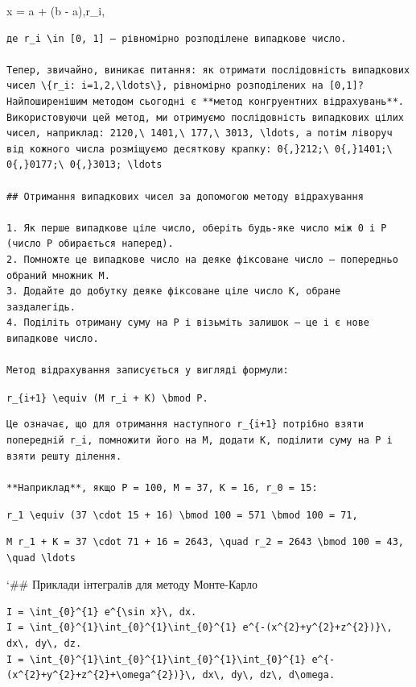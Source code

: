 \documentclass[
  ukrainian,
]{article}
\begin{document}
x = a + (b - a),r\_i,

\begin{verbatim}
де r_i \in [0, 1] — рівномірно розподілене випадкове число.

Тепер, звичайно, виникає питання: як отримати послідовність випадкових чисел \{r_i: i=1,2,\ldots\}, рівномірно розподілених на [0,1]? Найпоширенішим методом сьогодні є **метод конгруентних відрахувань**. Використовуючи цей метод, ми отримуємо послідовність випадкових цілих чисел, наприклад: 2120,\ 1401,\ 177,\ 3013, \ldots, а потім ліворуч від кожного числа розміщуємо десяткову крапку: 0{,}212;\ 0{,}1401;\ 0{,}0177;\ 0{,}3013; \ldots

## Отримання випадкових чисел за допомогою методу відрахування

1. Як перше випадкове ціле число, оберіть будь-яке число між 0 і P (число P обирається наперед).
2. Помножте це випадкове число на деяке фіксоване число — попередньо обраний множник M.
3. Додайте до добутку деяке фіксоване ціле число K, обране заздалегідь.
4. Поділіть отриману суму на P і візьміть залишок — це і є нове випадкове число.

Метод відрахування записується у вигляді формули:
\end{verbatim}

\texttt{r\_\{i+1\}\ \textbackslash{}equiv\ (M\ r\_i\ +\ K)\ \textbackslash{}bmod\ P.}

\begin{verbatim}
Це означає, що для отримання наступного r_{i+1} потрібно взяти попередній r_i, помножити його на M, додати K, поділити суму на P і взяти решту ділення.

**Наприклад**, якщо P = 100, M = 37, K = 16, r_0 = 15:
\end{verbatim}

\texttt{r\_1\ \textbackslash{}equiv\ (37\ \textbackslash{}cdot\ 15\ +\ 16)\ \textbackslash{}bmod\ 100\ =\ 571\ \textbackslash{}bmod\ 100\ =\ 71,}

\begin{verbatim}
M r_1 + K = 37 \cdot 71 + 16 = 2643, \quad r_2 = 2643 \bmod 100 = 43, \quad \ldots
\end{verbatim}

`\#\# Приклади інтегралів для методу Монте-Карло

\begin{verbatim}
I = \int_{0}^{1} e^{\sin x}\, dx.
I = \int_{0}^{1}\int_{0}^{1}\int_{0}^{1} e^{-(x^{2}+y^{2}+z^{2})}\, dx\, dy\, dz.
I = \int_{0}^{1}\int_{0}^{1}\int_{0}^{1}\int_{0}^{1} e^{-(x^{2}+y^{2}+z^{2}+\omega^{2})}\, dx\, dy\, dz\, d\omega.
\end{verbatim}
\end{document}
